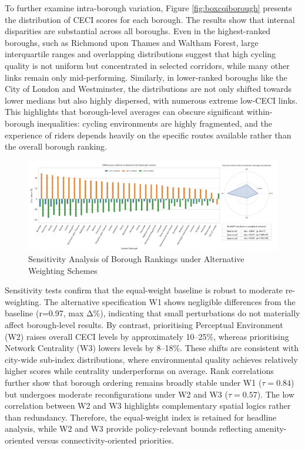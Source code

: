 \documentclass[
  12pt,
  oneside]{book}
\begin{document}
To further examine intra-borough variation, Figure \ref{fig:boxcqiborough} presents the distribution of CECI scores for each borough. The results show that internal disparities are substantial across all boroughs. Even in the highest-ranked boroughs, such as Richmond upon Thames and Waltham Forest, large interquartile ranges and overlapping distributions suggest that high cycling quality is not uniform but concentrated in selected corridors, while many other links remain only mid-performing. Similarly, in lower-ranked boroughs like the City of London and Westminster, the distributions are not only shifted towards lower medians but also highly dispersed, with numerous extreme low-CECI links. This highlights that borough-level averages can obscure significant within-borough inequalities: cycling environments are highly fragmented, and the experience of riders depends heavily on the specific routes available rather than the overall borough ranking.

\begin{figure}

{\centering \includegraphics[width=1\linewidth]{general_images/cqi_robustness_delta_bar} 

}

\caption{Sensitivity Analysis of Borough Rankings under Alternative Weighting Schemes}\label{fig:cqirobustnessdeltabar}
\end{figure}

Sensitivity tests confirm that the equal-weight baseline is robust to moderate re-weighting. The alternative specification W1 shows negligible differences from the baseline (r=0.97, max \textbar Δ\%), indicating that small perturbations do not materially affect borough-level results. By contrast, prioritising Perceptual Environment (W2) raises overall CECI levels by approximately 10--25\%, whereas prioritising Network Centrality (W3) lowers levels by 8--18\%. These shifts are consistent with city-wide sub-index distributions, where environmental quality achieves relatively higher scores while centrality underperforms on average. Rank correlations further show that borough ordering remains broadly stable under W1 (\(\tau = 0.84\)) but undergoes moderate reconfigurations under W2 and W3 (\(\tau = 0.57\)). The low correlation between W2 and W3 highlights complementary spatial logics rather than redundancy. Therefore, the equal-weight index is retained for headline analysis, while W2 and W3 provide policy-relevant bounds reflecting amenity-oriented versus connectivity-oriented priorities.
\end{document}
